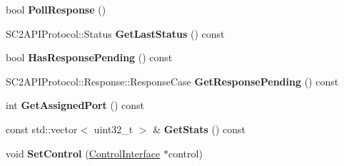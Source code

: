 \begin{DoxyCompactItemize}
bool {\bfseries Poll\+Response} ()
\item 
\mbox{\label{classsc2_1_1_proto_interface_a4fe3b76cf6a174189f41e81718c9c0bf}} 
S\+C2\+A\+P\+I\+Protocol\+::\+Status {\bfseries Get\+Last\+Status} () const
\item 
\mbox{\label{classsc2_1_1_proto_interface_a3480b4687b57ea0feea2bb158cc56c13}} 
bool {\bfseries Has\+Response\+Pending} () const
\item 
\mbox{\label{classsc2_1_1_proto_interface_a398e9c12408ee8bc45b3fc7c9849fa31}} 
S\+C2\+A\+P\+I\+Protocol\+::\+Response\+::\+Response\+Case {\bfseries Get\+Response\+Pending} () const
\item 
\mbox{\label{classsc2_1_1_proto_interface_a245d66808a9d6ac07eaa167c696ef8ac}} 
int {\bfseries Get\+Assigned\+Port} () const
\item 
\mbox{\label{classsc2_1_1_proto_interface_a3133ff62318eaf7109c161b21bab4174}} 
const std\+::vector$<$ uint32\+\_\+t $>$ \& {\bfseries Get\+Stats} () const
\item 
\mbox{\label{classsc2_1_1_proto_interface_a5f19f76c2c0c212841b934a151ac43b9}} 
void {\bfseries Set\+Control} (\hyperlink{classsc2_1_1_control_interface}{Control\+Interface} $\ast$control)
\end{DoxyCompactItemize}
